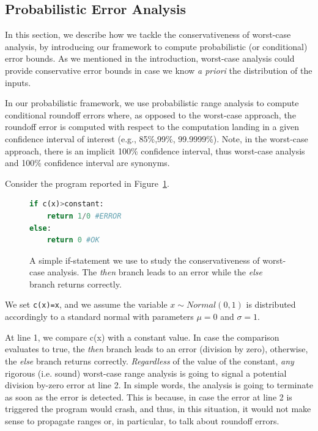 \subsection{Probabilistic Error Analysis}
\label{sec:prob}
%
In this section, we describe how we tackle the conservativeness of worst-case analysis, by introducing our framework to compute probabilistic (or conditional) error bounds.
%
As we mentioned in the introduction, worst-case analysis could provide conservative error bounds in case we know \emph{a priori} the distribution of the inputs. 
%
%

In our probabilistic framework, we use probabilistic range analysis to compute conditional roundoff errors where, as opposed to the worst-case approach, the roundoff error is computed with respect to the computation landing in a given confidence interval of interest (e.g., 85\%,99\%, 99.9999\%).
%
Note, in the worst-case approach, there is an implicit 100\% confidence interval, thus worst-case analysis and 100\% confidence interval are synonyms.
%

%
Consider the program reported in Figure~\ref{fig:prob}.
%
\begin{figure}[h!]
	\begin{lstlisting}[frame=single, language=Python]
if c(x)>constant:
	return 1/0 #ERROR
else:
	return 0 #OK
	\end{lstlisting}
	\caption{A simple if-statement we use to study the conservativeness of worst-case analysis. The \emph{then} branch leads to an error while the \emph{else} branch returns correctly.}
	\label{fig:prob}
\end{figure}
%
We set \lstinline{c(x)=x}, and we assume the variable $x\sim Normal(0,1)$ is distributed accordingly to a standard normal with parameters $\mu = 0$ and $\sigma = 1$.
%

At line 1, we compare c(x) with a constant value.
%
In case the comparison evaluates to true, the \emph{then} branch leads to an error (division by zero), otherwise, the \emph{else} branch returns correctly.
%
\emph{Regardless} of the value of the constant, \emph{any} rigorous (i.e. sound) worst-case range analysis is going to signal a potential division by-zero error at line 2.
%
In simple words, the analysis is going to terminate as soon as the error is detected.
%
This is because, in case the error at line 2 is triggered the program would crash, and thus, in this situation, it would not make sense to propagate ranges or, in particular, to talk about roundoff errors.

